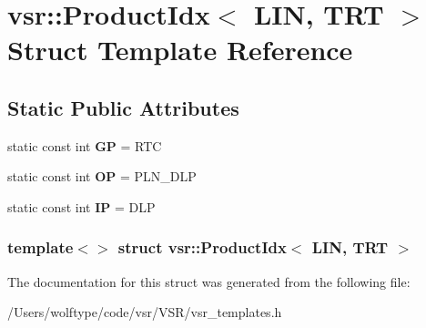 \hypertarget{structvsr_1_1_product_idx_3_01_l_i_n_00_01_t_r_t_01_4}{\section{vsr\-:\-:Product\-Idx$<$ L\-I\-N, T\-R\-T $>$ Struct Template Reference}
\label{structvsr_1_1_product_idx_3_01_l_i_n_00_01_t_r_t_01_4}
}
\subsection*{Static Public Attributes}
\begin{DoxyCompactItemize}
\item 
\hypertarget{structvsr_1_1_product_idx_3_01_l_i_n_00_01_t_r_t_01_4_a6025fd8a7639b79e97ff9b31132724a2}{static const int {\bfseries G\-P} = R\-T\-C}\label{structvsr_1_1_product_idx_3_01_l_i_n_00_01_t_r_t_01_4_a6025fd8a7639b79e97ff9b31132724a2}

\item 
\hypertarget{structvsr_1_1_product_idx_3_01_l_i_n_00_01_t_r_t_01_4_a068e0f7cc1f6953151b4155246bb815c}{static const int {\bfseries O\-P} = P\-L\-N\-\_\-\-D\-L\-P}\label{structvsr_1_1_product_idx_3_01_l_i_n_00_01_t_r_t_01_4_a068e0f7cc1f6953151b4155246bb815c}

\item 
\hypertarget{structvsr_1_1_product_idx_3_01_l_i_n_00_01_t_r_t_01_4_a48f8d460b4faa466a1f90f928aeec601}{static const int {\bfseries I\-P} = D\-L\-P}\label{structvsr_1_1_product_idx_3_01_l_i_n_00_01_t_r_t_01_4_a48f8d460b4faa466a1f90f928aeec601}

\end{DoxyCompactItemize}
\subsubsection*{template$<$$>$ struct vsr\-::\-Product\-Idx$<$ L\-I\-N, T\-R\-T $>$}



The documentation for this struct was generated from the following file\-:\begin{DoxyCompactItemize}
\item 
/\-Users/wolftype/code/vsr/\-V\-S\-R/vsr\-\_\-templates.\-h\end{DoxyCompactItemize}
